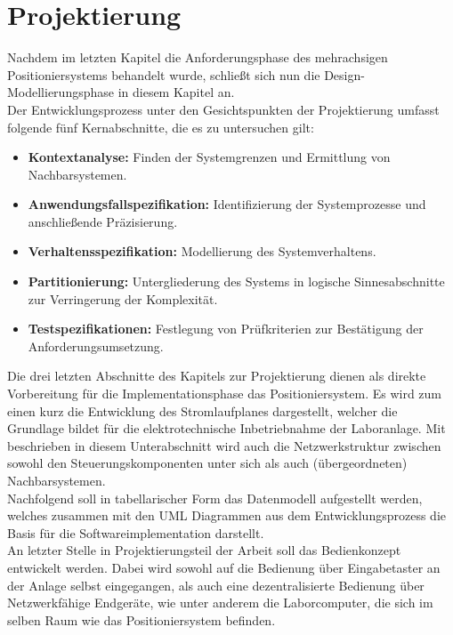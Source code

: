 \documentclass[../../Bachelorarbeit.tex]{subfiles}
\begin{document}
\section{Projektierung}
Nachdem im letzten Kapitel die Anforderungsphase des mehrachsigen Positioniersystems behandelt wurde, schließt sich nun die Design- \bzw Modellierungsphase in diesem Kapitel an.\\
Der Entwicklungsprozess unter den Gesichtspunkten der Projektierung umfasst folgende fünf Kernabschnitte, die es zu untersuchen gilt:

\begin{itemize}
    \item \textbf{Kontextanalyse:} Finden der Systemgrenzen und Ermittlung von Nachbarsystemen.
    \item \textbf{Anwendungsfallspezifikation:} Identifizierung der Systemprozesse und anschließende Präzisierung.
    \item \textbf{Verhaltensspezifikation:} Modellierung des Systemverhaltens.
    \item \textbf{Partitionierung:} Untergliederung des Systems in logische Sinnesabschnitte zur Verringerung der Komplexität.
    \item \textbf{Testspezifikationen:} Festlegung von Prüfkriterien zur Bestätigung der Anforderungsumsetzung.
\end{itemize}

Die drei letzten Abschnitte des Kapitels zur Projektierung dienen als direkte Vorbereitung für die Implementationsphase das Positioniersystem. Es wird zum einen kurz die Entwicklung des Stromlaufplanes dargestellt, welcher die Grundlage bildet für die elektrotechnische Inbetriebnahme der Laboranlage. Mit beschrieben in diesem Unterabschnitt wird auch die Netzwerkstruktur zwischen sowohl den Steuerungskomponenten unter sich als auch (übergeordneten) Nachbarsystemen. \\
Nachfolgend soll in tabellarischer Form das Datenmodell aufgestellt werden, welches zusammen mit den UML Diagrammen aus dem Entwicklungsprozess die Basis für die Softwareimplementation darstellt.\\
An letzter Stelle in Projektierungsteil der Arbeit soll das Bedienkonzept entwickelt werden. Dabei wird sowohl auf die Bedienung über Eingabetaster an der Anlage selbst eingegangen, als auch eine dezentralisierte Bedienung über Netzwerkfähige Endgeräte, wie unter anderem die Laborcomputer, die sich im selben Raum wie das Positioniersystem befinden.
\end{document}
